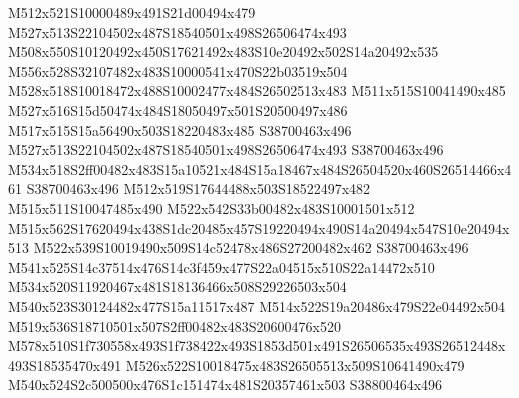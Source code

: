 \documentclass{article}
\begin{document}
\begin{multicols}{2}
M512x521S10000489x491S21d00494x479 M527x513S22104502x487S18540501x498S26506474x493 M508x550S10120492x450S17621492x483S10e20492x502S14a20492x535 M556x528S32107482x483S10000541x470S22b03519x504 M528x518S10018472x488S10002477x484S26502513x483 M511x515S10041490x485 M527x516S15d50474x484S18050497x501S20500497x486 M517x515S15a56490x503S18220483x485 S38700463x496 M527x513S22104502x487S18540501x498S26506474x493 S38700463x496 M534x518S2ff00482x483S15a10521x484S15a18467x484S26504520x460S26514466x461 S38700463x496 M512x519S17644488x503S18522497x482 M515x511S10047485x490 M522x542S33b00482x483S10001501x512 M515x562S17620494x438S1dc20485x457S19220494x490S14a20494x547S10e20494x513 M522x539S10019490x509S14c52478x486S27200482x462 S38700463x496 M541x525S14c37514x476S14c3f459x477S22a04515x510S22a14472x510 M534x520S11920467x481S18136466x508S29226503x504 M540x523S30124482x477S15a11517x487 M514x522S19a20486x479S22e04492x504 M519x536S18710501x507S2ff00482x483S20600476x520 M578x510S1f730558x493S1f738422x493S1853d501x491S26506535x493S26512448x493S18535470x491 M526x522S10018475x483S26505513x509S10641490x479 M540x524S2c500500x476S1c151474x481S20357461x503 S38800464x496









\end{multicols}
\end{document}
